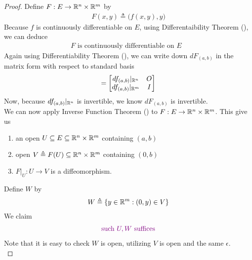 \documentclass{report}
\begin{document}
\begin{proof}
Define $F:E\rightarrow \mathbb{R}^n \times \mathbb{R}^m$ by 
\begin{align*}
F(x,y)\triangleq \Big(f(x,y),y \Big)
\end{align*}
Because $f$ is continuously differentiable on $E$, using Differentaibility Theorem (), we can deduce 
\begin{align*}
F\text{ is continuously differentiable on $E$ }
\end{align*}
Again using Differentiability Theorem  (), we can write down $dF_{(a,b)}$ in the matrix form with respect to standard basis
\begin{align*}
[dF_{(a,b)}]= \begin{bmatrix}
  df_{(a,b)}|_{\R^n} & O \\
  df_{(a,b)}|_{\R^m} & I
\end{bmatrix}
\end{align*}
Now, because $df_{(a,b)}|_{\mathbb{R}^n}$ is invertible, we know $dF_{(a,b)}$ is invertible.\\

We can now apply Inverse Function Theorem () to $F:E\rightarrow \mathbb{R}^n \times \mathbb{R}^m$. This give us 
\begin{enumerate}[label=(\alph*)]
  \item an open $U\subseteq E\subseteq \mathbb{R}^n \times \mathbb{R}^m$ containing $(a,b)$
  \item open $V\triangleq F(U)\subseteq \mathbb{R}^n \times \mathbb{R}^m$ containing $(0,b)$
  \item $F|_U:U\rightarrow V$ is a diffeomorphism.
\end{enumerate}
Define $W$ by 
\begin{align*}
W\triangleq \{ y\in\mathbb{R}^m : (0,y)\in V \}
\end{align*}
We claim 
\begin{align*}
\textcolor{violet}{\text{ such }U,W\text{ suffices }}
\end{align*}
Note that it is easy to check $W$ is open, utilizing $V$ is open and the same $\epsilon $.\\


\end{proof}
\end{document}
